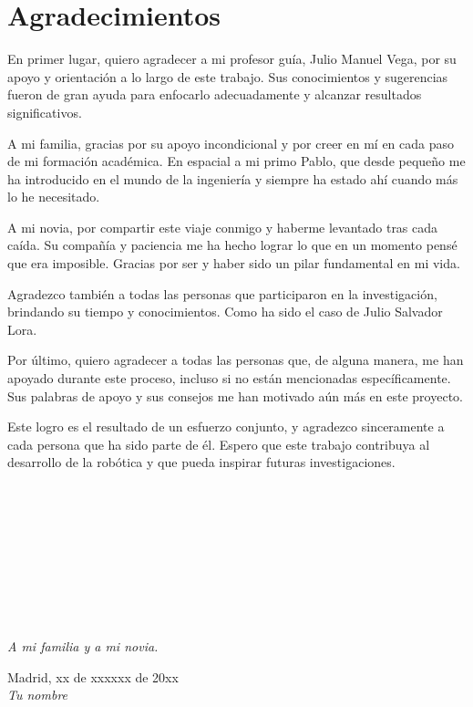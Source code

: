 \cleardoublepage

\chapter*{Agradecimientos}

En primer lugar, quiero agradecer a mi profesor guía, Julio Manuel Vega, por su apoyo y orientación a lo largo de este trabajo. Sus conocimientos y 
sugerencias fueron de gran ayuda para enfocarlo adecuadamente y alcanzar resultados significativos.

A mi familia, gracias por su apoyo incondicional y por creer en mí en cada paso de mi formación académica. En espacial a mi primo Pablo, que desde 
pequeño me ha introducido en el mundo de la ingeniería y siempre ha estado ahí cuando más lo he necesitado.

A mi novia, por compartir este viaje conmigo y haberme levantado tras cada caída. Su compañía y paciencia me ha hecho lograr lo que en un momento pensé 
que era imposible. Gracias por ser y haber sido un pilar fundamental en mi vida.

Agradezco también a todas las personas que participaron en la investigación, brindando su tiempo y conocimientos. Como ha sido el caso de Julio Salvador 
Lora.

Por último, quiero agradecer a todas las personas que, de alguna manera, me han apoyado durante este proceso, incluso si no están mencionadas 
específicamente. Sus palabras de apoyo y sus consejos me han motivado aún más en este proyecto.

Este logro es el resultado de un esfuerzo conjunto, y agradezco sinceramente a cada persona que ha sido parte de él. Espero que este 
trabajo contribuya al desarrollo de la robótica y que pueda inspirar futuras investigaciones.

\ %

\

\

\

\

\begin{flushright}
		\vspace{4.0 cm}
		\emph{A mi familia y a mi novia.}\\
		\par
		\vspace{1.0 cm}
		Madrid, xx de xxxxxx de 20xx\\ %
		\emph{Tu nombre}
\end{flushright}

\thispagestyle{empty}

